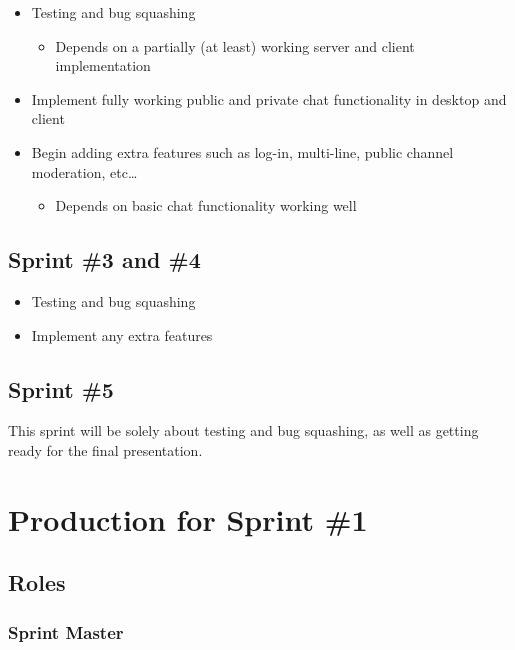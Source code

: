 \documentclass[11pt]{article}
\begin{document}
\begin{itemize}
\item Testing and bug squashing
\begin{itemize}
\item Depends on a partially (at least) working server and client implementation
\end{itemize}
\item Implement fully working public and private chat functionality in
desktop and client
\item Begin adding extra features such as log-in, multi-line, public
channel moderation, etc\ldots{}
\begin{itemize}
\item Depends on basic chat functionality working well
\end{itemize}
\end{itemize}

\subsection{Sprint \#3 and \#4}
\label{sec-4-3}

\begin{itemize}
\item Testing and bug squashing
\item Implement any extra features
\end{itemize}

\subsection{Sprint \#5}
\label{sec-4-4}

This sprint will be solely about testing and bug squashing, as well as
getting ready for the final presentation.

\section{Production for Sprint \#1}
\label{sec-5}

\subsection{Roles}
\label{sec-5-1}

\subsubsection{Sprint Master}
\label{sec-5-1-1}
\end{document}
